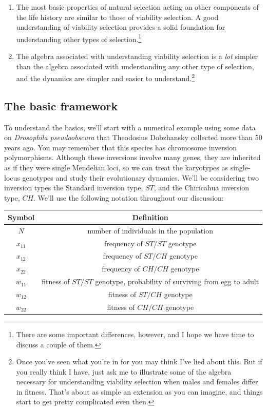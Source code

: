 \begin{enumerate}

\item The most basic properties of natural selection acting on other
  components of the life history are similar to those of viability
  selection. A good understanding of viability selection provides a
  solid foundation for understanding other types of
  selection.\footnote{There are some important differences, however,
    and I hope we have time to discuss a couple of them.}

\item The algebra associated with understanding viability selection is
  a {\it lot\/} simpler than the algebra associated with understanding
  any other type of selection, and the dynamics are simpler and
  easier to understand.\footnote{Once you've seen what you're in for
    you may think I've lied about this. But if you really think I
    have, just ask me to illustrate some of the algebra necessary for
    understanding viability selection when males and females differ in
    fitness. That's about as simple an extension as you can imagine,
    and things start to get pretty complicated even then.}

\end{enumerate}

\subsection*{The basic framework}

To understand the basics, we'll start with a numerical example using
some data on {\it Drosophila pseudoobscura\/} that Theodosius
Dobzhansky collected more than 50 years ago. You may remember that
this species has chromosome inversion polymorphisms. Although these
inversions involve many genes, they are inherited as if they were
single Mendelian loci, so we can treat the karyotypes as single-locus
genotypes and study their evolutionary dynamics. We'll be considering
two inversion types the Standard inversion type, $ST$, and the
Chiricahua inversion type, $CH$. We'll use the following notation
throughout our discussion:

\begin{center}
\begin{tabular}{cc}
\hline\hline
Symbol  & Definition \\
\hline
$N$      & number of individuals in the population \\
$x_{11}$ & frequency of $ST/ST$ genotype \\
$x_{12}$ & frequency of $ST/CH$ genotype \\
$x_{22}$ & frequency of $CH/CH$ genotype \\
$w_{11}$ & fitness of $ST/ST$ genotype, probability of surviving from
           egg to adult \\
$w_{12}$ & fitness of $ST/CH$ genotype \\
$w_{22}$ & fitness of $CH/CH$ genotype \\
\hline
\end{tabular}
\end{center}

